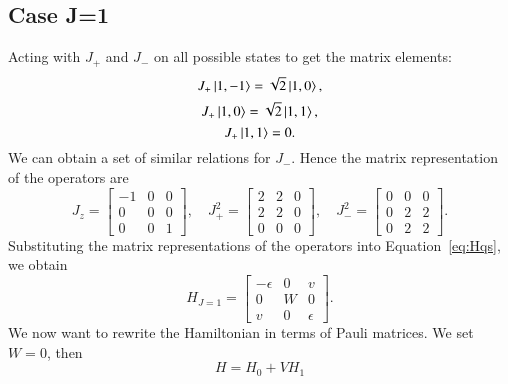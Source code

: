 \subsection{Case J=1}
\label{subsec:case_j1}
Acting with $ J_+ $ and $ J_- $ on all possible states to get the matrix elements:
\[ J_+ \ket{1,-1} = \sqrt{2}\ket{1,0}, \] 
\[ J_+ \ket{1,0} = \sqrt{2} \ket{1,1}, \] 
\[ J_+ \ket{1,1} = 0. \] 
We can obtain a set of similar relations for $ J_- $. Hence the matrix representation of the operators are
\begin{equation}
	J_z = 
	\begin{bmatrix}
		-1 & 0 & 0 \\
		0 & 0 & 0 \\
		0 & 0 & 1
	\end{bmatrix}, \quad
	J_+^2 = \begin{bmatrix}
		2 & 2 & 0 \\
		2 & 2 & 0 \\
		0 & 0 & 0
	\end{bmatrix}, \quad
	J_-^2  = \begin{bmatrix}
		0 & 0 & 0 \\
		0 & 2 & 2 \\
		0 & 2 & 2
	\end{bmatrix}.
\end{equation}
Substituting the matrix representations of the operators into Equation~\eqref{eq:Hqs}, we obtain
\begin{equation}
	\label{eq:j1mat}
	H_{J=1} = \begin{bmatrix}
		-\epsilon & 0 & v \\
		0 & W & 0 \\
		v & 0 & \epsilon
	\end{bmatrix}.
\end{equation}
We now want to rewrite the Hamiltonian in terms of Pauli matrices. We set $ W=0 $, then \[ H = H_0 + VH_1 \] 

